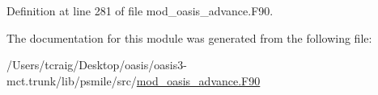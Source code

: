 Definition at line 281 of file mod\+\_\+oasis\+\_\+advance.\+F90.



The documentation for this module was generated from the following file\+:\begin{DoxyCompactItemize}
\item 
/\+Users/tcraig/\+Desktop/oasis/oasis3-\/mct.\+trunk/lib/psmile/src/\hyperlink{mod__oasis__advance_8_f90}{mod\+\_\+oasis\+\_\+advance.\+F90}\end{DoxyCompactItemize}
